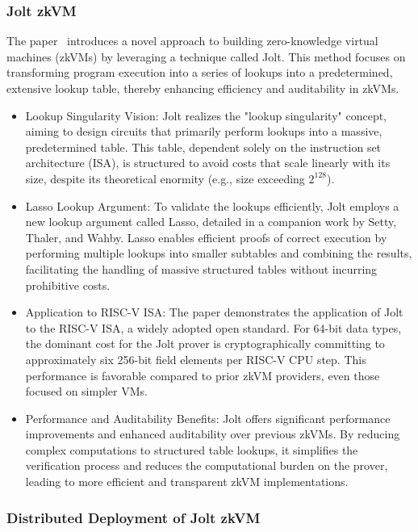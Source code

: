 \subsubsection{Jolt zkVM}
The paper~\cite{jolt} introduces a novel approach to building zero-knowledge virtual machines (zkVMs) by leveraging a technique called Jolt. This method focuses on transforming program execution into a series of lookups into a predetermined, extensive lookup table, thereby enhancing efficiency and auditability in zkVMs. 

\begin{itemize}
    \item Lookup Singularity Vision: Jolt realizes the "lookup singularity" concept, aiming to design circuits that primarily perform lookups into a massive, predetermined table. This table, dependent solely on the instruction set architecture (ISA), is structured to avoid costs that scale linearly with its size, despite its theoretical enormity (e.g., size exceeding $2^128$). 

    \item Lasso Lookup Argument: To validate the lookups efficiently, Jolt employs a new lookup argument called Lasso, detailed in a companion work by Setty, Thaler, and Wahby. Lasso enables efficient proofs of correct execution by performing multiple lookups into smaller subtables and combining the results, facilitating the handling of massive structured tables without incurring prohibitive costs. 

    \item Application to RISC-V ISA: The paper demonstrates the application of Jolt to the RISC-V ISA, a widely adopted open standard. For 64-bit data types, the dominant cost for the Jolt prover is cryptographically committing to approximately six 256-bit field elements per RISC-V CPU step. This performance is favorable compared to prior zkVM providers, even those focused on simpler VMs. 

    \item Performance and Auditability Benefits: Jolt offers significant performance improvements and enhanced auditability over previous zkVMs. By reducing complex computations to structured table lookups, it simplifies the verification process and reduces the computational burden on the prover, leading to more efficient and transparent zkVM implementations. 

\end{itemize}


\subsubsection{Distributed Deployment of Jolt zkVM}  

